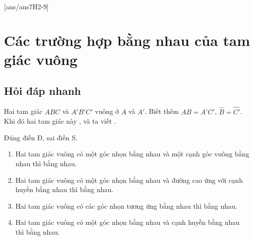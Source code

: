 [ans/ans7H2-9]
\section{Các trường hợp bằng nhau của tam giác vuông}

\subsection{Hỏi đáp nhanh}
\begin{ex}%
	Hai tam giác $ABC$ và $A'B'C'$ vuông ở $A$ và $A'$. Biết thêm $AB=A'C'$, $\widehat{B}=\widehat{C'}$. Khi đó hai tam giác này , và ta viết  .
\end{ex}
\begin{ex}%
	Đúng điền Đ, sai điền S.
	\begin{enumerate}
		\item {} Hai tam giác vuông có một góc nhọn bằng nhau và một cạnh góc vuông bằng nhau thì bằng nhau.
		\item {} Hai tam giác vuông có một góc nhọn bằng nhau và đường cao ứng với cạnh huyền bằng nhau thì bằng nhau.
		\item {} Hai tam giác vuông có các góc nhọn tương ứng bằng nhau thì bằng nhau.
		\item {} Hai tam giác vuông có một góc nhọn bằng nhau và cạnh huyền bằng nhau thì bằng nhau.
	\end{enumerate}	
\end{ex}

